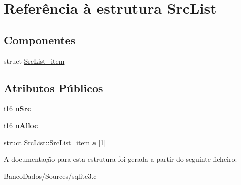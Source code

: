 \hypertarget{struct_src_list}{\section{Referência à estrutura Src\-List}
\label{struct_src_list}
}
\subsection*{Componentes}
\begin{DoxyCompactItemize}
\item 
struct \hyperlink{struct_src_list_1_1_src_list__item}{Src\-List\-\_\-item}
\end{DoxyCompactItemize}
\subsection*{Atributos Públicos}
\begin{DoxyCompactItemize}
\item 
\hypertarget{struct_src_list_a99c1d923c49fc0598d92f1cb54958ef4}{i16 {\bfseries n\-Src}}\label{struct_src_list_a99c1d923c49fc0598d92f1cb54958ef4}

\item 
\hypertarget{struct_src_list_aae88b994b131fea8c733aa609bae7e6e}{i16 {\bfseries n\-Alloc}}\label{struct_src_list_aae88b994b131fea8c733aa609bae7e6e}

\item 
\hypertarget{struct_src_list_acd181938f7144b40022b28072247aa3d}{struct \hyperlink{struct_src_list_1_1_src_list__item}{Src\-List\-::\-Src\-List\-\_\-item} {\bfseries a} \mbox{[}1\mbox{]}}\label{struct_src_list_acd181938f7144b40022b28072247aa3d}

\end{DoxyCompactItemize}


A documentação para esta estrutura foi gerada a partir do seguinte ficheiro\-:\begin{DoxyCompactItemize}
\item 
Banco\-Dados/\-Sources/sqlite3.\-c\end{DoxyCompactItemize}

